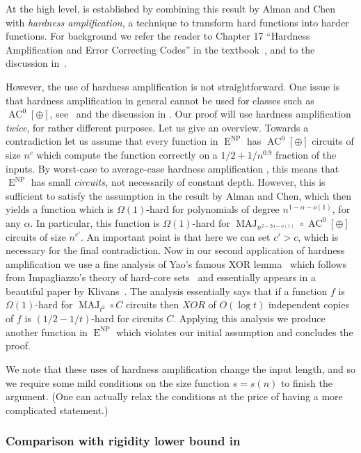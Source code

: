 \documentclass{toc}
\DeclareMathOperator{\MAJ}{\mathrm{MAJ}}  %
\DeclareMathOperator{\AC}{\mathrm{AC}}  %
\DeclareMathOperator{\NP}{\mathrm{NP}}  %
\DeclareMathOperator{\EEE}{\mathrm{E}}  %
\begin{document}
At the high level,  is established by combining
this result by Alman and Chen with \emph{hardness amplification},
a technique to transform hard functions into harder functions. For
background we refer the reader to Chapter 17 ``Hardness Amplification
and Error Correcting Codes'' in the textbook~\cite{SanjeevBarak2007},
and to the discussion in~\cite{ShV-dec}.

However, the use of hardness amplification is not straightforward.
One issue is that hardness amplification in general cannot be used
for classes such as $\AC^{0}[\oplus]$, see~\cite{GrinbergSV-adaptivemajority}
and the discussion in \cite{ShV-dec,Viola-PhDthesis-journal-hack}.
Our proof will use hardness amplification \emph{twice}, for rather
different purposes. Let us give an overview. Towards a contradiction
let us assume that every function in $\EEE^{\NP}$ has $\AC^{0}[\oplus]$
circuits of size $n^{c}$ which compute the function correctly on
a $1/2+1/n^{0.9}$ fraction of the inputs. By worst-case to average-case
hardness amplification %
\cite{BFNW93,Imp95,STV01}, %
%
this means
that $\EEE^{\NP}$ has small \emph{circuits, }not necessarily of constant
depth. However, this is sufficient to satisfy the assumption in the
result by Alman and Chen, which then yields a function which is $\Omega(1)$-hard
for polynomials of degree $n^{1-\alpha-o(1)}$, for any $\alpha$.
In particular, this function is $\Omega(1)$-hard for $\MAJ_{n^{2-2\alpha-o(1)}}\circ \AC^{0}[\oplus]$
circuits of size $n^{c'}$. An important point is that here we can
set $c'>c$, which is necessary for the final contradiction. Now in
our second application of hardness amplification we use a fine analysis
of Yao's famous XOR lemma~\cite{GNW95} which follows from Impagliazzo's
theory of hard-core sets~\cite{Imp95} and essentially appears in
a beautiful paper by Klivans~\cite{Kli01}. The analysis essentially
says that if a function $f$ is $\Omega(1)$-hard for $\MAJ_{t^{2}}\circ C$
circuits then $XOR$ of $O(\log t)$ independent copies of $f$ is
$(1/2-1/t)$-hard for circuits $C$. Applying this analysis we produce
another function in $\EEE^{\NP}$ which violates our initial assumption
and concludes the proof.

We note that these uses of hardness amplification change the input
length, and so we require some mild conditions on the size function
$s=s(n)$ to finish the argument. (One can actually relax the conditions
at the price of having a more complicated statement.)

\subsubsection{Comparison with rigidity lower bound in~\cite{AlmanC19}}
\end{document}
